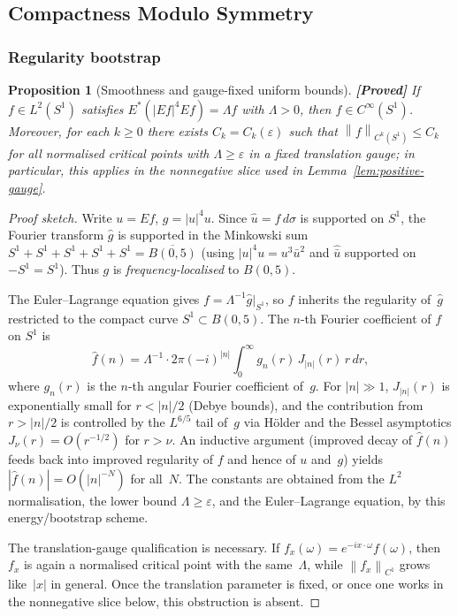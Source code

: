 \documentclass[12pt]{article}
\newtheorem{proposition}[theorem]{Proposition}
\theoremstyle{definition}
\theoremstyle{remark}
\newcommand{\wh}{\widehat}
\newcommand{\norm}[1]{\left\|#1\right\|}
\newcommand{\proven}{\textbf{\color{teal}[Proved]}}
\begin{document}
\subsection{Compactness Modulo Symmetry}
\label{sec:compactness}

\subsubsection{Regularity bootstrap}

\begin{proposition}[Smoothness and gauge-fixed uniform bounds]
  \label{prop:bootstrap}
  \proven\quad
  If $f\in L^2(S^1)$ satisfies $E^*(|Ef|^4Ef)=\Lambda f$ with
  $\Lambda>0$, then $f\in C^\infty(S^1)$.  Moreover, for each
  $k\geq 0$ there exists $C_k=C_k(\varepsilon)$ such that
  $\norm{f}_{C^k(S^1)}\leq C_k$ for all normalised critical points
  with $\Lambda\geq\varepsilon$ in a fixed translation gauge; in
  particular, this applies in the nonnegative slice used in
  Lemma~\ref{lem:positive-gauge}.
\end{proposition}

\begin{proof}[Proof sketch]
  Write $u=Ef$, $g=|u|^4u$.  Since $\wh u=f\,d\sigma$ is supported on
  $S^1$, the Fourier transform $\wh g$ is supported in the Minkowski sum
  $S^1+S^1+S^1+S^1+S^1=\overline{B(0,5)}$ (using $|u|^4u=u^3\bar u^2$
  and $\wh{\bar u}$ supported on $-S^1=S^1$).  Thus $g$ is
  \emph{frequency-localised} to $B(0,5)$.

  The Euler--Lagrange equation gives $f=\Lambda^{-1}\wh g\big|_{S^1}$,
  so $f$ inherits the regularity of~$\wh g$ restricted to the compact
  curve $S^1\subset B(0,5)$.  The $n$-th Fourier coefficient of $f$
  on $S^1$ is
  \begin{equation}\label{eq:fourier-bootstrap}
    \wh f(n)
    = \Lambda^{-1}\cdot 2\pi(-i)^{|n|}
      \int_0^\infty g_n(r)\,J_{|n|}(r)\,r\,dr,
  \end{equation}
  where $g_n(r)$ is the $n$-th angular Fourier coefficient of~$g$.
  For $|n|\gg 1$, $J_{|n|}(r)$ is exponentially small for $r<|n|/2$
  (Debye bounds), and the contribution from $r>|n|/2$ is controlled by
  the $L^{6/5}$ tail of~$g$ via H\"older and the Bessel asymptotics
  $J_\nu(r)=O(r^{-1/2})$ for $r>\nu$.  An inductive argument (improved
  decay of $\wh f(n)$ feeds back into improved regularity of $f$ and
  hence of $u$ and~$g$) yields $|\wh f(n)|=O(|n|^{-N})$ for all~$N$.
  The constants are obtained from the $L^2$ normalisation, the lower
  bound $\Lambda\geq\varepsilon$, and the Euler--Lagrange equation, by
  this energy/bootstrap scheme.

  The translation-gauge qualification is necessary.  If
  $f_x(\omega)=e^{-ix\cdot\omega}f(\omega)$, then $f_x$ is again a
  normalised critical point with the same~$\Lambda$, while
  $\norm{f_x}_{C^1}$ grows like~$|x|$ in general.  Once the translation
  parameter is fixed, or once one works in the nonnegative slice below,
  this obstruction is absent.
\end{proof}
\end{document}
